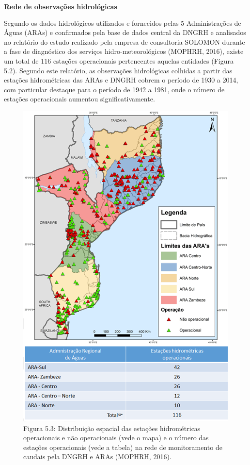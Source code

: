 \documentclass[
]{book}
\begin{document}
\textbf{Rede de observações hidrológicas}

Segundo os dados hidrológicos utilizados e fornecidos pelas 5 Administrações de Águas (ARAs) e confirmados pela base de dados central da DNGRH e analisados no relatório do estudo realizado pela empresa de consultoria SOLOMON durante a fase de diagnóstico dos serviços hidro-meteorológicos (MOPHRH, 2016), existe um total de 116 estações operacionais pertencentes aquelas entidades (Figura 5.2). Segundo este relatório, as observações hidrológicas colhidas a partir das estações hidrométricas das ARAs e DNGRH cobrem o período de 1930 a 2014, com particular destaque para o período de 1942 a 1981, onde o número de estações operacionais aumentou significativamente.

\begin{figure}
\centering
\includegraphics{images/hidrometricas_operacionais.png}
\caption{Figura 5.3: Distribuição espacial das estações hidrométricas operacionais e não operacionais (vede o mapa) e o número das estações operacionais (vede a tabela) na rede de monitoramento de caudais pela DNGRH e ARAs (MOPHRH, 2016).}
\end{figure}
\end{document}
